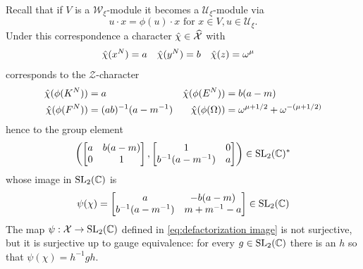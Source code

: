 \documentclass{sl2ams}
\numberwithin{equation}{section}
\newcommand{\Z}{\mathcal{Z}}
\newcommand{\U}{\mathcal{U}}
\newcommand{\W}{\mathcal{W}}
\begin{document}
Recall that if \(V\) is a \(\W_{\xi}\)-module it becomes a \(\U_{\xi}\)-module via
\[
  u \cdot x = \phi(u) \cdot x \text{ for } x \in V, u \in \U_{\xi}.
\]
Under this correspondence a character \(\hat \chi \in \widehat{\mathcal{X}}\) with
\begin{align*}
  \hat{\chi}(x^{N}) &= a
                      &
  \hat{\chi}(y^{N}) &= b
                      &
  \hat{\chi}(z) &= \omega^{\mu}
\end{align*}
corresponds to the \(\Z\)-character
\begin{align*}
  \hat{\chi}(\phi(K^{N}))  &= a
                             &
  \hat{\chi}(\phi(E^{N}))  &= b(a - m)
  \\
  \hat{\chi}(\phi(F^{N})) &= (ab)^{-1}(a - m^{-1})
                            &
  \hat{\chi}(\phi(\Omega)) &= \omega^{\mu + 1/2} + \omega^{-(\mu + 1/2)}
\end{align*}
hence to the group element
\[
  \left(
      \begin{bmatrix}
        a & b(a-m) \\
        0 & 1
      \end{bmatrix}
      ,
      \begin{bmatrix}
        1 & 0 \\
        b^{-1}(a - m^{-1}) & a
      \end{bmatrix}
  \right)
      \in \operatorname{SL}_2(\mathbb{C})^*
\]
whose image in \(\operatorname{SL}_2(\mathbb{C})\) is
\begin{equation}
  \label{eq:defactorization image}
  \psi(\chi) = 
  \begin{bmatrix}
    a & -b(a-m) \\
    b^{-1}(a-m^{-1}) & m + m^{-1} -a
  \end{bmatrix}
  \in \operatorname{SL}_2(\mathbb{C})
\end{equation}
The map \(\psi : \mathcal{X} \to \operatorname{SL}_2(\mathbb{C})\) defined in \cref{eq:defactorization image} is not surjective, but it is surjective up to gauge equivalence: for every \(g \in \operatorname{SL}_2(\mathbb{C})\) there is an \(h\) so that \(\psi(\chi) = h^{-1} g h\).
\end{document}
